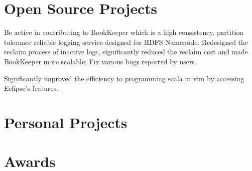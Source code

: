 \documentclass[11pt,a4paper,sans]{moderncv} %
\begin{document}
\section{Open Source Projects}

{
Be active in contributing to BookKeeper which is a high consistency, partition tolerance reliable logging service designed for HDFS Namenode. Redesigned the reclaim process of inactive logs, significantly reduced the reclaim cost and made BookKeeper more scalable; Fix various bugs reported by users.
\newline{}
}

{
Significantly improved the efficiency to programming scala in vim by accessing Eclipse's features.
}

\section{Personal Projects}


\section{Awards}
\end{document}
